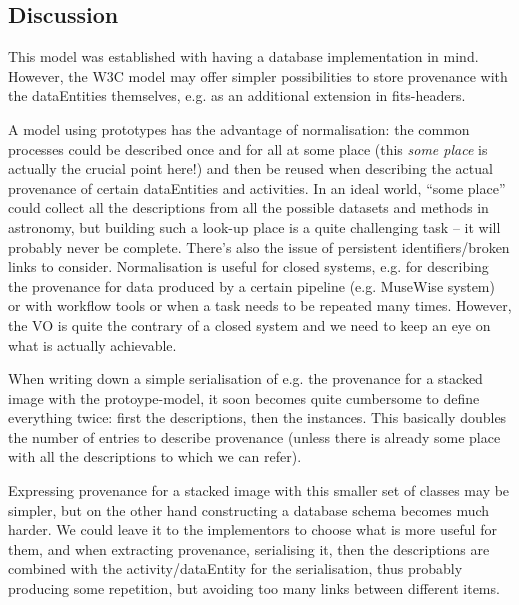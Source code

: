 \subsection{Discussion}
This model was established with having a database implementation in mind. However, the W3C model may offer simpler possibilities to store provenance with the dataEntities themselves, e.g. as an additional extension in fits-headers.

A model using prototypes has the advantage of normalisation: the common processes could be described once and for all at some place (this \emph{some place} is actually the crucial point here!) and then be reused when describing the actual provenance of certain dataEntities and activities.
In an ideal world, ``some place'' could collect all the descriptions from all 
the possible datasets and methods in astronomy, but building such a look-up place is a quite challenging task -- it will probably never be complete. There's also the issue of persistent identifiers/broken links to consider.
Normalisation is useful for closed systems, e.g. for describing the provenance for data produced by a certain pipeline (e.g. MuseWise system) or with workflow tools or when a task needs to be repeated many times. However, the VO is quite the contrary of a closed system and we need to keep an eye on what is actually achievable.

When writing down a simple serialisation of e.g. the provenance for a stacked image with the protoype-model, it soon becomes quite cumbersome to define everything twice: first the descriptions, then the instances. This basically doubles the number of entries to describe provenance (unless there is already some place with all the descriptions to which we can refer).

Expressing provenance for a stacked image with this smaller set of classes may be simpler, but on the other hand constructing a database schema becomes much harder. 
We could leave it to the implementors to choose what is more useful for them, and when extracting provenance, serialising it, then the descriptions are combined with the activity/dataEntity for 
the serialisation, thus probably producing some repetition, but avoiding too many 
links between different items.



